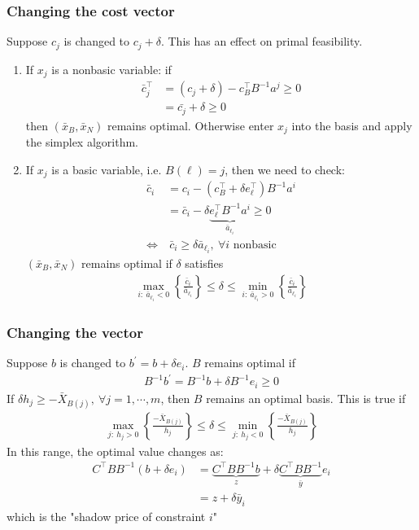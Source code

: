 \documentclass[11pt]{article}
\numberwithin{equation}{section}
\begin{document}
\subsubsection{Changing the cost vector}
Suppose $c_j$ is changed to $c_j + \delta$. This has an effect on primal feasibility. \begin{enumerate}
    \item If $x_j$ is a nonbasic variable: if \begin{align*}
        \bar{c}_j^\top &= (c_j + \delta) - c^\top_B B^{-1} a^j \geq 0 \\
        &= \bar{c_j} + \delta \geq 0
    \end{align*}
    then $(\bar{x}_B, \bar{x}_N)$ remains optimal. Otherwise enter $x_j$ into the basis and apply the simplex algorithm.
    \item If $x_j$ is a basic variable, i.e. $B(\ell)=j$, then we need to check: \begin{align*}
        \bar{c}_i &= c_i - \left( c_B^\top + \delta e^\top_\ell \right)B^{-1}a^i \\
        &= \bar{c}_i - \delta \underbrace{e^\top_\ell B^{-1}a^i}_{\bar{a}_{\ell_i}} \geq 0 \\
        \Longleftrightarrow &\ \bar{c}_i \geq \delta \bar{a}_{\ell_i}, \ \forall i \text{ nonbasic}
    \end{align*}
    $\left( \bar{x}_B, \bar{x}_N \right)$ remains optimal if $\delta$ satisfies \begin{align*}
        \max_{i:\ \bar{a}_{\ell_i}<0}\left\{ \frac{\bar{c}_i}{\bar{a}_{\ell_i}} \right\} \leq \delta \leq \min_{i:\ \bar{a}_{\ell_i}>0}\left\{ \frac{\bar{c}_i}{\bar{a}_{\ell_i}} \right\}
    \end{align*}
\end{enumerate}

\subsubsection{Changing the vector}
Suppose $b$ is changed to $b^\prime=b+ \delta e_i$. $B$ remains optimal if \begin{align*}
    B^{-1} b^\prime = B^{-1} b + \delta B^{-1}e_i \geq 0
\end{align*}
If $\delta h_j \geq -\bar{X}_{B(j)}, \ \forall j=1, \cdots, m$, then $B$ remains an optimal basis. This is true if \begin{align*}
    \max_{j:\ h_j > 0}\left\{ \frac{-\bar{X}_{B(j)}}{h_j} \right\} \leq \delta \leq \min_{j:\ h_j < 0}\left\{ \frac{-\bar{X}_{B(j)}}{h_j} \right\}
\end{align*}
In this range, the optimal value changes as: \begin{align*}
    C^\top B B^{-1} \left( b + \delta e_i \right) &= \underbrace{C^\top B B^{-1} b}_z + \delta \underbrace{C^\top B B^{-1}}_{\bar{y}} e_i \\
    &= z + \delta \bar{y}_i
\end{align*}
which is the "shadow price of constraint $i$"
\end{document}
